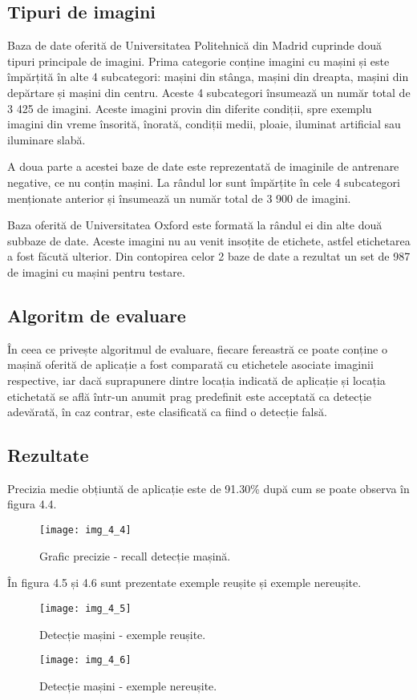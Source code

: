 \subsection{Tipuri de imagini}

Baza de date oferită de Universitatea Politehnică din Madrid cuprinde două tipuri principale de imagini. Prima categorie conține imagini cu mașini și este împărțită în alte 4 subcategori: mașini din stânga, mașini din dreapta, mașini din depărtare și mașini din centru. Aceste 4 subcategori însumează un număr total de 3 425 de imagini. Aceste imagini provin din diferite condiții, spre exemplu imagini din vreme însorită, înorată, condiții medii, ploaie, iluminat artificial sau iluminare slabă.

A doua parte a acestei baze de date este reprezentată de imaginile de antrenare negative, ce nu conțin mașini. La rândul lor sunt împărțite în cele 4 subcategori menționate anterior și însumează un număr total de 3 900 de imagini.

Baza oferită de Universitatea Oxford este formată la rândul ei din alte două subbaze de date. Aceste imagini nu au venit insoțite de etichete, astfel etichetarea a fost făcută ulterior. Din contopirea celor 2 baze de date a rezultat un set de 987 de imagini cu mașini pentru testare.

\subsection{Algoritm de evaluare}

În ceea ce privește algoritmul de evaluare, fiecare fereastră ce poate conține o mașină oferită de aplicație a fost comparată cu etichetele asociate imaginii respective, iar dacă suprapunere dintre locația indicată de aplicație și locația etichetată se află într-un anumit prag predefinit este acceptată ca detecție adevărată, în caz contrar, este clasificată ca fiind o detecție falsă.

\subsection{Rezultate}

Precizia medie obțiuntă de aplicație este de 91.30\% după cum se poate observa în figura 4.4.

\begin{figure}[!h]
	\centering
	\texttt{[image: img\_4\_4]}
	\caption{Grafic precizie - recall detecție mașină.}
\end{figure}

În figura 4.5 și 4.6 sunt prezentate exemple reușite și exemple nereușite. 

\begin{figure}[!h]
	\centering
	\texttt{[image: img\_4\_5]}
	\caption{Detecție mașini - exemple reușite.}
\end{figure}
\begin{figure}[!ht]
	\centering
	\texttt{[image: img\_4\_6]}
	\caption{Detecție mașini - exemple nereușite.}
\end{figure}